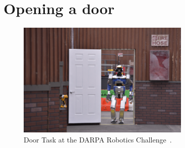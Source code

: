 \section{Opening a door}
	\label{sub:door}
	
	\begin{figure}[t]
		\centering
		\includegraphics[height = 5.5cm]{img/door-drc}
		\caption{Door Task at the DARPA Robotics Challenge~\cite{DARPA}.}
		\label{fig:door-drc}
	\end{figure}